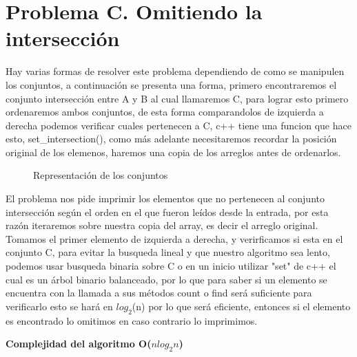 \documentclass[12pt]{article}
\begin{document}
    \newpage %

    \section*{Problema C. Omitiendo la intersección}
    Hay varias formas de resolver este problema dependiendo de como se manipulen los conjuntos, a continuación se presenta una forma,
    primero encontraremos el conjunto intersección entre A y B al cual llamaremos C, para lograr esto primero ordenaremos ambos conjuntos, de esta forma 
    comparandolos de izquierda a derecha podemos verificar cuales pertenecen a C, c++ tiene una funcion que hace esto,
    set\_intersection(), como más adelante necesitaremos recordar la posición
    original de los elemenos, haremos una copia de los arreglos antes de ordenarlos.    

    \begin{figure}[h]
        \centering
        \caption{ Representación de los conjuntos }
    \end{figure}

    \hspace{8mm} El problema nos pide imprimir los elementos que no pertenecen al conjunto intersección según el orden en 
    el que fueron leídos desde la entrada, por esta razón iteraremos sobre nuestra copia del array, es decir el arreglo original.
    Tomamos el primer elemento de izquierda a derecha, y verirficamos si esta en el conjunto C, para evitar la busqueda lineal y que 
    nuestro algoritmo sea lento, podemos usar
    busqueda binaria sobre C o en un inicio utilizar "set" de c++ el cual es un árbol binario balanceado, por lo que
    para saber si un elemento se encuentra con la llamada a sus métodos count o find será suficiente para verificarlo
    esto se hará en $log_{2}$(n) por lo que será eficiente,
    entonces si el elemento es encontrado lo omitimos en caso contrario lo imprimimos.

    \vspace{1cm}
    \begin{flushright}
        \boldmath
        \textbf{ Complejidad del algoritmo O($nlog_{2}n$) }
    \end{flushright}
\end{document}
